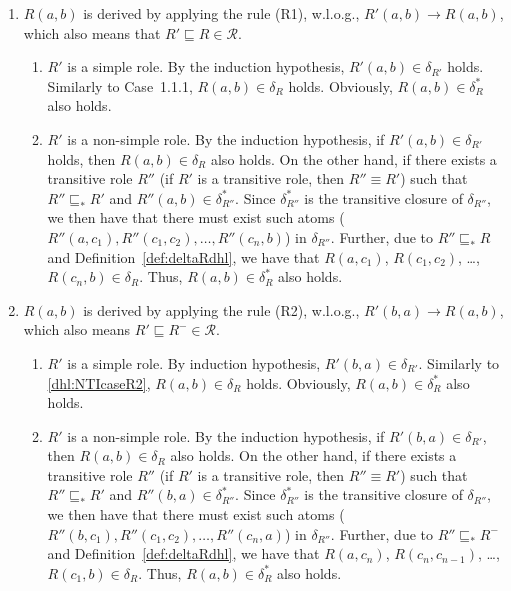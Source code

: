 \begin{enumerate}[leftmargin=12ex,label=Case~2.\arabic*, ref=Case~2.\arabic*]
\item $R(a,b)$ is derived by applying the rule (R1), w.l.o.g., $R'(a,b)\rightarrow R(a,b)$,
    which also means that $R'\sqsubseteq R\in\mathcal{R}$.\label{dhl:TcaseR1}
    \begin{enumerate}[leftmargin=8ex,label=Case~2.1.\arabic*]
    \item $R'$ is a simple role. By the induction hypothesis, $R'(a,b)\in\delta_{R'}$ holds.
        Similarly to Case~1.1.1, $R(a,b)\in\delta_{R}$ holds.
        Obviously, $R(a,b)\in\delta_{R}^*$ also holds.

    \item $R'$ is a non-simple role. By the induction hypothesis, if $R'(a,b)\in\delta_{R'}$ holds,
        then $R(a,b)\in\delta_R$ also holds. On the other hand, if there exists a transitive role
        $R''$ (if $R'$ is a transitive role, then $R''\equiv R'$) such that
        $R''\sqsubseteq_* R'$ and $R''(a,b)\in\delta_{R''}^*$. Since $\delta_{R''}^*$ is
        the transitive closure of $\delta_{R''}$, we then have that there must
        exist such atoms ($R''(a,c_1),R''(c_1,c_2),\ldots ,R''(c_n,b)$) in $\delta_{R''}$.
        Further, due to $R''\sqsubseteq_* R$ and Definition~\ref{def:deltaRdhl},
        we have that $R(a,c_1)$, $R(c_1,c_2)$, \ldots, $R(c_n,b)\in\delta_{R}$. Thus, $R(a,b)\in\delta_{R}^*$
        also holds.
    \end{enumerate}

\item $R(a,b)$ is derived by applying the rule (R2), w.l.o.g., $R'(b,a)\rightarrow R(a,b)$,
    which also means $R'\sqsubseteq R^-\in\mathcal{R}$.\label{dhl:TcaseR2}
    \begin{enumerate}[leftmargin=8ex,label=Case~2.2.\arabic*,ref=Case~2.2.\arabic*]
    \item $R'$ is a simple role. By induction hypothesis, $R'(b,a)\in\delta_{R'}$.
        Similarly to \ref{dhl:NTIcaseR2}, $R(a,b)\in\delta_{R}$ holds.
        Obviously, $R(a,b)\in\delta_{R}^*$ also holds.

    \item $R'$ is a non-simple role. By the induction hypothesis, if $R'(b,a)\in\delta_{R'}$,
        then $R(a,b)\in\delta_R$ also holds. On the other hand, if there exists a transitive role
        $R''$ (if $R'$ is a transitive role, then $R''\equiv R'$) such that
        $R''\sqsubseteq_* R'$ and $R''(b,a)\in\delta_{R''}^*$. Since $\delta_{R''}^*$ is
        the transitive closure of $\delta_{R''}$, we then have that there must
        exist such atoms ($R''(b,c_1),R''(c_1,c_2),\ldots ,R''(c_n,a)$) in $\delta_{R''}$.
        Further, due to $R''\sqsubseteq_* R^-$ and Definition~\ref{def:deltaRdhl},
        we have that $R(a,c_n)$, $R(c_n,c_{n-1})$, \ldots, $R(c_1,b)\in\delta_{R}$. Thus, $R(a,b)\in\delta_{R}^*$
        also holds.
    \end{enumerate}


\end{enumerate}
